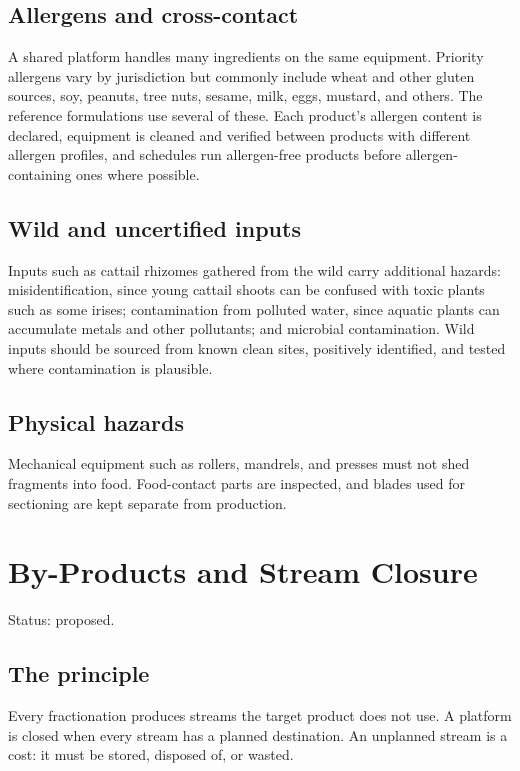 \documentclass[11pt,openany]{book}
\theoremstyle{definition}
\begin{document}
\section{Allergens and cross-contact}

A shared platform handles many ingredients on the same equipment. Priority allergens vary by jurisdiction but commonly include wheat and other gluten sources, soy, peanuts, tree nuts, sesame, milk, eggs, mustard, and others. The reference formulations use several of these. Each product's allergen content is declared, equipment is cleaned and verified between products with different allergen profiles, and schedules run allergen-free products before allergen-containing ones where possible.

\section{Wild and uncertified inputs}

Inputs such as cattail rhizomes gathered from the wild carry additional hazards: misidentification, since young cattail shoots can be confused with toxic plants such as some irises; contamination from polluted water, since aquatic plants can accumulate metals and other pollutants; and microbial contamination. Wild inputs should be sourced from known clean sites, positively identified, and tested where contamination is plausible.

\section{Physical hazards}

Mechanical equipment such as rollers, mandrels, and presses must not shed fragments into food. Food-contact parts are inspected, and blades used for sectioning are kept separate from production.

\chapter{By-Products and Stream Closure}\label{ch:closure}

Status: proposed.

\section{The principle}

Every fractionation produces streams the target product does not use. A platform is closed when every stream has a planned destination. An unplanned stream is a cost: it must be stored, disposed of, or wasted.
\end{document}
